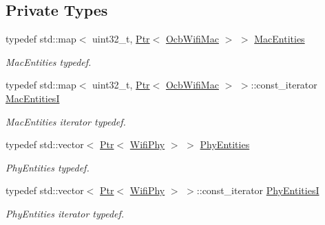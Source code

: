 \subsection*{Private Types}
\begin{DoxyCompactItemize}
\item 
typedef std\+::map$<$ uint32\+\_\+t, \hyperlink{classns3_1_1Ptr}{Ptr}$<$ \hyperlink{classns3_1_1OcbWifiMac}{Ocb\+Wifi\+Mac} $>$ $>$ \hyperlink{classns3_1_1WaveNetDevice_aa9993b2c252f7ffb8bf802c8f708359d}{Mac\+Entities}
\begin{DoxyCompactList}\small\item\em Mac\+Entities typedef. \end{DoxyCompactList}\item 
typedef std\+::map$<$ uint32\+\_\+t, \hyperlink{classns3_1_1Ptr}{Ptr}$<$ \hyperlink{classns3_1_1OcbWifiMac}{Ocb\+Wifi\+Mac} $>$ $>$\+::const\+\_\+iterator \hyperlink{classns3_1_1WaveNetDevice_a6511363042ad221a19c4cda0d328e0fc}{Mac\+EntitiesI}
\begin{DoxyCompactList}\small\item\em Mac\+Entities iterator typedef. \end{DoxyCompactList}\item 
typedef std\+::vector$<$ \hyperlink{classns3_1_1Ptr}{Ptr}$<$ \hyperlink{classns3_1_1WifiPhy}{Wifi\+Phy} $>$ $>$ \hyperlink{classns3_1_1WaveNetDevice_a3f2285fdbb8db9d733db91e55ebd8b43}{Phy\+Entities}
\begin{DoxyCompactList}\small\item\em Phy\+Entities typedef. \end{DoxyCompactList}\item 
typedef std\+::vector$<$ \hyperlink{classns3_1_1Ptr}{Ptr}$<$ \hyperlink{classns3_1_1WifiPhy}{Wifi\+Phy} $>$ $>$\+::const\+\_\+iterator \hyperlink{classns3_1_1WaveNetDevice_ab7544e360cf30da8b42e84caf14c8e8a}{Phy\+EntitiesI}
\begin{DoxyCompactList}\small\item\em Phy\+Entities iterator typedef. \end{DoxyCompactList}\end{DoxyCompactItemize}

